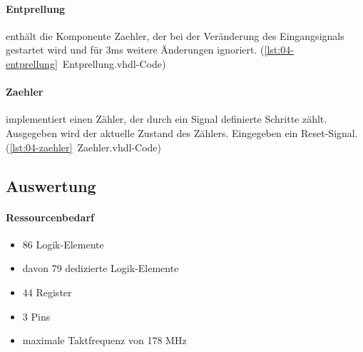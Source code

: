 \paragraph{Entprellung} enthält die Komponente Zaehler, der bei der Veränderung des Eingangsignals gestartet wird und für 3ms weitere Änderungen ignoriert. (\ref{lst:04-entprellung}~Entprellung.vhdl-Code) 

\paragraph{Zaehler} implementiert einen Zähler, der durch ein Signal definierte Schritte zählt. Ausgegeben wird der aktuelle Zustand des Zählers. Eingegeben ein Reset-Signal. (\ref{lst:04-zaehler}~Zaehler.vhdl-Code) 


\subsection{Auswertung}
\paragraph{Ressourcenbedarf}
\begin{itemize} 
\item 86 Logik-Elemente
\item davon 79 dedizierte Logik-Elemente
\item 44 Register
\item 3 Pins 
\item maximale Taktfrequenz von 178 MHz
\end{itemize}
